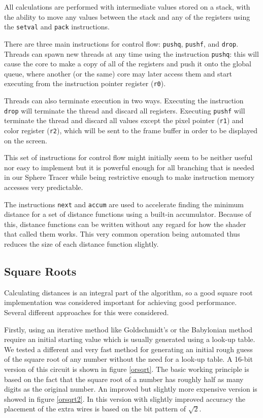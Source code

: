 			All calculations are performed with intermediate values stored on a
			stack, with the ability to move any values between the stack and
			any of the registers using the \texttt{setval} and \texttt{pack}
			instructions.

			There are three main instructions for control flow: \texttt{pushq},
			\texttt{pushf}, and \texttt{drop}. Threads can spawn new threads at
			any time using the instruction \texttt{pushq}: this will cause the
			core to make a copy of all of the registers and push it onto the
			global queue, where another (or the same) core may later access
			them and start executing from the instruction pointer register
			(\texttt{r0}).

			Threads can also terminate execution in two ways. Executing the
			instruction \texttt{drop} will terminate the thread and discard all
			registers. Executing \texttt{pushf} will terminate the thread and
			discard all values except the pixel pointer (\texttt{r1}) and color
			register (\texttt{r2}), which will be sent to the frame buffer in
			order to be displayed on the screen.

			This set of instructions for control flow might initially seem to be
			neither useful nor easy to implement but it is powerful enough for all
			branching that is needed in our Sphere Tracer while being restrictive
			enough to make instruction memory accesses very predictable.

			The instructions \texttt{next} and \texttt{accum} are used to accelerate
			finding the minimum distance for a set of distance functions using a
			built-in accumulator. Because of this, distance functions can be written
			without any regard for how the shader that called them works. This very
			common operation being automated thus reduces the size of each distance
			function slightly.

		\subsection{Square Roots}

			Calculating distances is an integral part of the algorithm, so a
			good square root implementation was considered important for
			achieving good performance. Several different approaches for this
			were considered.

			Firstly, using an iterative method like Goldschmidt's or the 
			Babylonian
			method require an initial starting value which is usually generated
			using a look-up table. We tested a different and very fast method for
			generating an initial rough guess of the square root of any number
			without the need for a look-up table. A 16-bit version of this circuit is
			shown in figure \ref{orsqrt}. The basic working principle is
			based on the fact that the square root of a number has roughly half as
			many digits as the original number. An improved but slightly more expensive
			version is showed in figure \ref{orsqrt2}. In this version with slightly improved
			accuracy the placement of the extra wires is based on the bit pattern of
			$\sqrt{2}$.

